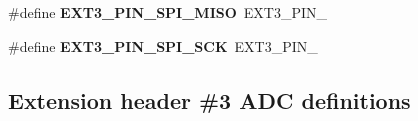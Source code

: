\begin{DoxyCompactItemize}
\item 
\hypertarget{group__saml21__xplained__pro__features__group_gaa713a5309de3721cb9324bdbe92b4be4}{}\#define {\bfseries E\+X\+T3\+\_\+\+P\+I\+N\+\_\+\+S\+P\+I\+\_\+\+M\+I\+S\+O}~E\+X\+T3\+\_\+\+P\+I\+N\+\_\label{group__saml21__xplained__pro__features__group_gaa713a5309de3721cb9324bdbe92b4be4}

\item 
\hypertarget{group__saml21__xplained__pro__features__group_gaef6c5a494b75787ab10a3c23c82488c9}{}\#define {\bfseries E\+X\+T3\+\_\+\+P\+I\+N\+\_\+\+S\+P\+I\+\_\+\+S\+C\+K}~E\+X\+T3\+\_\+\+P\+I\+N\+\_\label{group__saml21__xplained__pro__features__group_gaef6c5a494b75787ab10a3c23c82488c9}

\end{DoxyCompactItemize}
\subsection*{Extension header \#3 A\+D\+C definitions}
